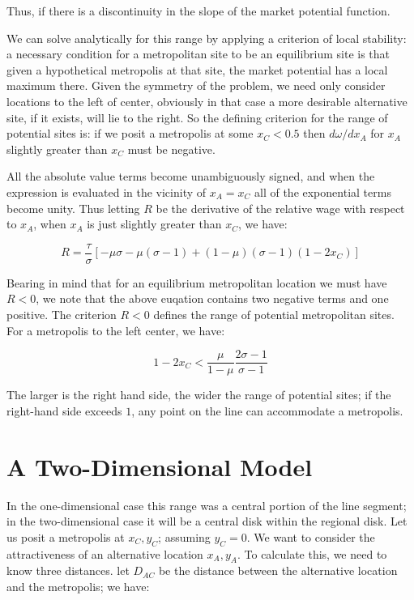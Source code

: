 Thus, if there is a discontinuity in the slope of the market potential function.

We can solve analytically for this range by applying a criterion of local stability: a necessary condition for a metropolitan site to be an equilibrium site is that given a hypothetical metropolis at that site, the market potential has a local maximum there. Given the symmetry of the problem, we need only consider locations to the left of center, obviously in that case a more desirable alternative site, if it exists, will lie to the right. So the defining criterion for the range of potential sites is: if we posit a metropolis at some $x_C < 0.5$ then $d\omega / dx_A$ for $x_A$ slightly greater than $x_C$ must be negative.

All the absolute value terms become unambiguously signed, and when the expression is evaluated in the vicinity of $x_A = x_C$ all of the exponential terms become unity. Thus letting $R$ be the derivative of the relative wage with respect to $x_A$, when $x_A$ is just slightly greater than $x_C$, we have:

\begin{equation}
    R = \frac{\tau}{\sigma}[-\mu \sigma - \mu(\sigma - 1) + (1 - \mu)(\sigma - 1)(1 - 2x_C)]
\end{equation}

Bearing in mind that for an equilibrium metropolitan location we must have $R < 0$, we note that the above euqation contains two negative terms and one positive. The criterion $R < 0$ defines the range of potential metropolitan sites. For a metropolis to the left center, we have:

\begin{equation}
    1 - 2x_C < \frac{\mu}{1 - \mu} \frac{2\sigma - 1}{\sigma - 1}
\end{equation}

The larger is the right hand side, the wider the range of potential sites; if the right-hand side exceeds $1$, any point on the line can accommodate a metropolis.

\section{A Two-Dimensional Model}

In the one-dimensional case this range was a central portion of the line segment; in the two-dimensional case it will be a central disk within the regional disk. Let us posit a metropolis at $x_C, y_C$; assuming $y_C = 0$. We want to consider the attractiveness of an alternative location $x_A, y_A$. To calculate this, we need to know three distances. let $D_{AC}$ be the distance between the alternative location and the metropolis; we have:

